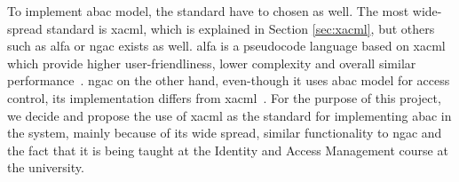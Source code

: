 To implement \acrshort{abac} model, the standard have to chosen as well. The most wide-spread standard is \acrshort{xacml}, which is explained in Section \ref{sec:xacml}, but others such as \acrfull{alfa} or \acrfull{ngac} exists as well. \acrshort{alfa} is a pseudocode language based on \acrshort{xacml} which provide higher user-friendliness, lower complexity and overall similar performance~\cite{Mejri2016FormalPolicies}. \acrshort{ngac} on the other hand, even-though it uses \acrshort{abac} model for access control, its implementation differs from \acrshort{xacml}~\cite{Ferraiolo2016ANGAC}. For the purpose of this project, we decide and propose the use of \acrshort{xacml} as the standard for implementing \acrshort{abac} in the system, mainly because of its wide spread, similar functionality to \acrshort{ngac} and the fact that it is being taught at the Identity and Access Management course at the university.